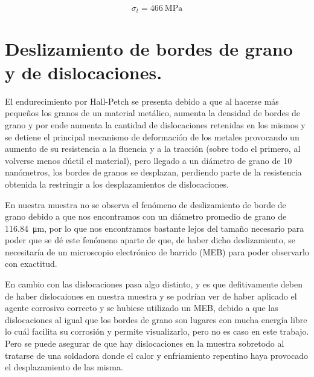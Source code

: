 \documentclass[12pt,a4paper]{article}
\begin{document}
\begin{equation}
    \sigma_t = \SI{466}{\mega\pascal}
\end{equation}

\section{Deslizamiento de bordes de grano y de dislocaciones.}

El endurecimiento por Hall-Petch se presenta debido a que al hacerse más pequeños los granos de un material metálico, aumenta la densidad de bordes de grano y por ende aumenta la cantidad de dislocaciones retenidas en los mismos y se detiene el principal mecanismo de deformación de los metales provocando un aumento de su resistencia a la fluencia y a la tracción (sobre todo el primero, al volverse menos dúctil el material), pero llegado a un diámetro de grano de 10 nanómetros, los bordes de granos se desplazan, perdiendo parte de la resistencia obtenida la restringir a los desplazamientos de dislocaciones.

En nuestra muestra no se observa el fenómeno de deslizamiento de borde de grano debido a que nos encontramos con un diámetro promedio de grano de \SI{116,84}{\micro\metre}, por lo que nos encontramos bastante lejos del tamaño necesario para poder que se dé este fenómeno aparte de que, de haber dicho deslizamiento, se necesitaría de un microscopio electrónico de barrido (MEB) para poder observarlo con exactitud.

En cambio con las dislocaciones pasa algo distinto, y es que defitivamente deben de haber dislocaiones en nuestra muestra y se podrían ver de haber aplicado el agente corrosivo correcto y se hubiese utilizado un MEB, debido a que las dislocaciones al igual que los bordes de grano son lugares con mucha energía libre lo cuál facilita su corrosión y permite visualizarlo, pero no es caso en este trabajo. Pero se puede asegurar de que hay dislocaciones en la muestra sobretodo al tratarse de una soldadora donde el calor y enfriamiento repentino haya provocado el desplazamiento de las misma.
\end{document}
